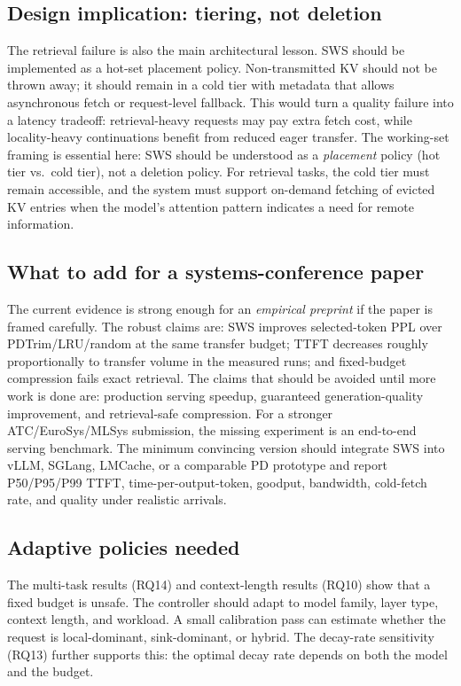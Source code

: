 \documentclass[11pt]{article}
\newcommand{\method}{SWS}
\newcommand{\sws}{SWS}
\theoremstyle{definition}
\theoremstyle{plain}
\begin{document}
\subsection{Design implication: tiering, not deletion}
The retrieval failure is also the main architectural lesson.  \sws{} should be implemented as a hot-set placement policy.  Non-transmitted KV should not be thrown away; it should remain in a cold tier with metadata that allows asynchronous fetch or request-level fallback.  This would turn a quality failure into a latency tradeoff: retrieval-heavy requests may pay extra fetch cost, while locality-heavy continuations benefit from reduced eager transfer.  The working-set framing is essential here: \sws{} should be understood as a \emph{placement} policy (hot tier vs.\ cold tier), not a deletion policy.  For retrieval tasks, the cold tier must remain accessible, and the system must support on-demand fetching of evicted KV entries when the model's attention pattern indicates a need for remote information.

\subsection{What to add for a systems-conference paper}
The current evidence is strong enough for an \emph{empirical preprint} if the paper is framed carefully.  The robust claims are: \method{} improves selected-token PPL over PDTrim/LRU/random at the same transfer budget; TTFT decreases roughly proportionally to transfer volume in the measured runs; and fixed-budget compression fails exact retrieval.  The claims that should be avoided until more work is done are: production serving speedup, guaranteed generation-quality improvement, and retrieval-safe compression.  For a stronger ATC/EuroSys/MLSys submission, the missing experiment is an end-to-end serving benchmark.  The minimum convincing version should integrate \method{} into vLLM, SGLang, LMCache, or a comparable PD prototype and report P50/P95/P99 TTFT, time-per-output-token, goodput, bandwidth, cold-fetch rate, and quality under realistic arrivals.

\subsection{Adaptive policies needed}
The multi-task results (RQ14) and context-length results (RQ10) show that a fixed budget is unsafe.  The controller should adapt to model family, layer type, context length, and workload.  A small calibration pass can estimate whether the request is local-dominant, sink-dominant, or hybrid.  The decay-rate sensitivity (RQ13) further supports this: the optimal decay rate depends on both the model and the budget.
\end{document}
